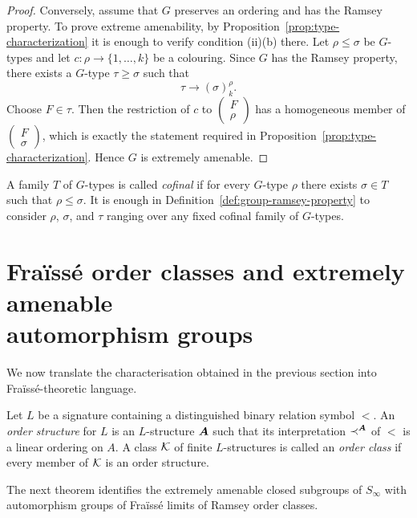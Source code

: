 \begin{proof}
    Conversely, assume that \(G\) preserves an ordering and has the Ramsey property. To prove extreme amenability, by Proposition~\ref{prop:type-characterization} it is enough to verify condition (ii)(b) there. Let \(\rho\leq \sigma\) be \(G\)-types and let \(c\colon \rho\to\{1,\dots,k\}\) be a colouring. Since \(G\) has the Ramsey property, there exists a \(G\)-type \(\tau\geq \sigma\) such that
    \[
        \tau\to (\sigma)^\rho_k.
    \]
    Choose \(F\in\tau\). Then the restriction of \(c\) to \(\begin{pmatrix} F \\ \rho \end{pmatrix}\) has a homogeneous member of \(\begin{pmatrix} F \\ \sigma \end{pmatrix}\), which is exactly the statement required in Proposition~\ref{prop:type-characterization}. Hence \(G\) is extremely amenable.
\end{proof}



\begin{remark}
    \label{rem:cofinal-types}
    A family \(T\) of \(G\)-types is called \emph{cofinal} if for every \(G\)-type \(\rho\) there exists \(\sigma\in T\) such that \(\rho\leq \sigma\).
    It is enough in Definition~\ref{def:group-ramsey-property} to consider \(\rho\), \(\sigma\), and \(\tau\) ranging over any fixed cofinal family of \(G\)-types.
\end{remark}



\section[Fraïssé order classes]{Fraïssé order classes and extremely amenable\\automorphism groups}
\label{sec:fraisse-order-classes-and-ea-groups}

We now translate the characterisation obtained in the previous section into Fraïssé-theoretic language.

Let \(L\) be a signature containing a distinguished binary relation symbol \(<\). An \emph{order structure} for \(L\) is an \(L\)-structure \(\boldsymbol{A}\) such that its interpretation \(\prec^{\boldsymbol{A}}\) of \(<\) is a linear ordering on \(A\). A class \(\mathcal{K}\) of finite \(L\)-structures is called an \emph{order class} if every member of \(\mathcal{K}\) is an order structure.

The next theorem identifies the extremely amenable closed subgroups of \(S_\infty\) with automorphism groups of Fraïssé limits of Ramsey order classes.

